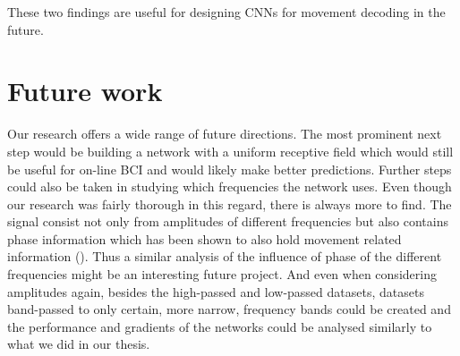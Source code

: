 These two findings are useful for designing CNNs for movement decoding in the future.

\section*{Future work}
Our research offers a wide range of future directions.
The most prominent next step would be building a network with a uniform receptive field which would still be useful for on-line BCI and would likely make better predictions.
Further steps could also be taken in studying which frequencies the network uses.
Even though our research was fairly thorough in this regard, there is always more to find.
The signal consist not only from amplitudes of different frequencies but also contains phase information which has been shown to also hold movement related information (\cite{Hammer-2021, hartmann-hierarchical-2018}). 
Thus a similar analysis of the influence of phase of the different frequencies might be an interesting future project.
And even when considering amplitudes again, besides the high-passed and low-passed datasets, datasets band-passed to only certain, more narrow, frequency bands could be created and the performance and gradients of the networks could be analysed similarly to what we did in our thesis.



